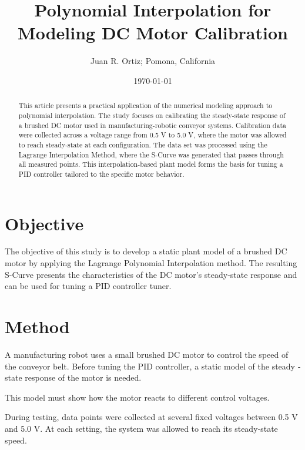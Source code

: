 \documentclass[letterpaper,twocolumn,fleqn]{article}
\title{ Polynomial Interpolation for Modeling DC Motor Calibration }
\author{ Juan R. Ortiz; Pomona, California}
\date{\today} %
\begin{document}
 
\maketitle 
\thispagestyle{empty} %


\begin{abstract}
This article presents a practical application of the numerical modeling approach to polynomial interpolation. The study focuses on calibrating the steady-state response of a brushed DC motor used in manufacturing-robotic conveyor systems. Calibration data were collected across a voltage range from 0.5 V to 5.0 V, where the motor was allowed to reach steady-state at each configuration. The data set was processed using the Lagrange Interpolation Method, where the S-Curve was generated that passes through all measured points. This interpolation-based plant model forms the basis for tuning a PID controller tailored to the specific motor behavior. 
\end{abstract}

\section{Objective}
\label{sec:intro}
The objective of this study is to develop a static plant model of a brushed DC motor by applying the Lagrange Polynomial Interpolation method. The resulting S-Curve presents the characteristics of the DC motor's steady-state response and can be used for tuning a PID controller tuner.

\section{Method}
A manufacturing robot uses a small brushed DC motor to control the speed of the conveyor belt. Before tuning the PID controller, a static model of the steady ‐ state response of the motor is needed. 
\vspace{0.1in}

\noindent This model must show how the motor reacts to different control voltages. 
\vspace{0.1in}

\noindent During testing, data points were collected at several fixed voltages between 0.5 V and 5.0 V. At each setting, the system was allowed to reach its steady‑state speed.
\end{document}
